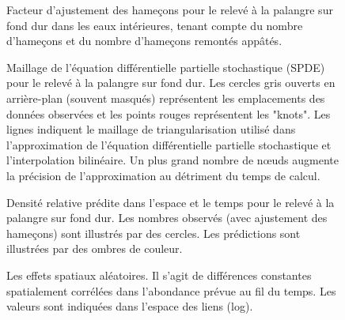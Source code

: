 \documentclass[11pt]{book}
\begin{document}
\begin{figure}[htb]

{\centering {} 

}

\caption{Facteur d’ajustement des hameçons pour le relevé à la palangre sur fond dur dans les eaux intérieures, tenant compte du nombre d’hameçons et du nombre d’hameçons remontés appâtés.}\label{fig:hbll-hook-adjustment}
\end{figure}
\begin{figure}[htb]

{\centering {} 

}

\caption{Maillage de l’équation différentielle partielle stochastique (SPDE) pour le relevé à la palangre sur fond dur. Les cercles gris ouverts en arrière-plan (souvent masqués) représentent les emplacements des données observées et les points rouges représentent les "knots". Les lignes indiquent le maillage de triangularisation utilisé dans l’approximation de l’équation différentielle partielle stochastique et l’interpolation bilinéaire. Un plus grand nombre de nœuds augmente la précision de l’approximation au détriment du temps de calcul.}\label{fig:hbll-spde}
\end{figure}
\begin{figure}[htb]

{\centering {} 

}

\caption{Densité relative prédite dans l’espace et le temps pour le relevé à la palangre sur fond dur. Les nombres observés (avec ajustement des hameçons) sont illustrés par des cercles. Les prédictions sont illustrées par des ombres de couleur.}\label{fig:hbll-predicted-spacetime}
\end{figure}
\begin{figure}[htb]

{\centering {} 

}

\caption{Les effets spatiaux aléatoires. Il s’agit de différences constantes spatialement corrélées dans l’abondance prévue au fil du temps. Les valeurs sont indiquées dans l’espace des liens (log).}\label{fig:hbll-spatial-re}
\end{figure}
\end{document}
